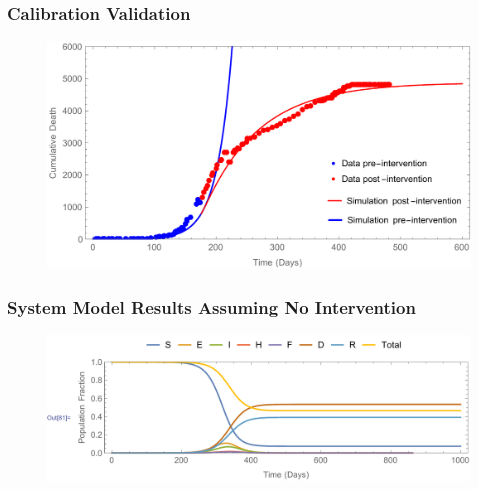 \documentclass[30pt]{beamer}
\begin{document}
\begin{frame}
\frametitle{Calibration Validation}
\begin{figure}[!h]
  \centering
  \includegraphics[width=1\textwidth]{ValidationPlot.pdf}
 \end{figure}
\end{frame}



\begin{frame}
\frametitle{System Model Results Assuming No Intervention}
\begin{figure}[!h]
  \centering
  \includegraphics[width=1\textwidth]{SEIPlotNoInt.pdf}
\label{fig:LB_IM_NoIn} 
\end{figure}
\end{frame}
\end{document}
